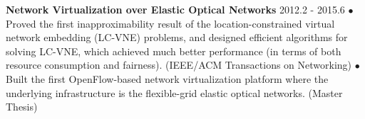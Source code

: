 \documentclass[line,11pt,letter]{includes/cls/myRes}
\begin{document}
\begin{resume}
{\setlength{\parskip}{0pt}
{\bf Network Virtualization over Elastic Optical Networks} \hfill 2012.2 - 2015.6\break
{\hspace*{1em} $\bullet$ Proved the first inapproximability result of the location-constrained virtual network embedding (LC-VNE) problems, and designed efficient algorithms for solving LC-VNE, which achieved much better performance (in terms of both resource consumption and fairness). (IEEE/ACM Transactions on Networking)\hfill\break}
{\hspace*{1em} $\bullet$ Built the first OpenFlow-based network virtualization platform where the underlying infrastructure is the flexible-grid elastic optical networks. (Master Thesis)\hfill\break}
}
\negspace

\end{resume}
\end{document}
